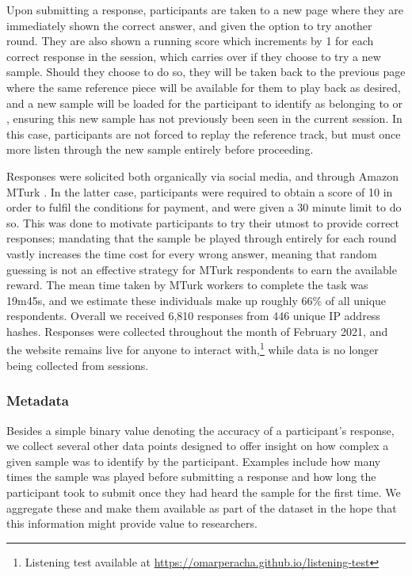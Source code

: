 \documentclass{article}
\begin{document}
Upon submitting a response, participants are taken to a new page where they are immediately shown the correct answer, and given the option to try another round. They are also shown a running score which increments by 1 for each correct response in the session, which carries over if they choose to try a new sample. Should they choose to do so, they will be taken back to the previous page where the same reference piece will be available for them to play back as desired, and a new sample will be loaded for the participant to identify as belonging to  or , ensuring this new sample has not previously been seen in the current session. In this case, participants are not forced to replay the reference track, but must once more listen through the new sample entirely before proceeding.

Responses were solicited both organically via social media, and through Amazon MTurk \cite{mturk}. In the latter case, participants were required to obtain a score of 10 in order to fulfil the conditions for payment, and were given a 30 minute limit to do so. This was done to motivate participants to try their utmost to provide correct responses; mandating that the sample be played through entirely for each round vastly increases the time cost for every wrong answer, meaning that random guessing is not an effective strategy for MTurk respondents to earn the available reward. The mean time taken by MTurk workers to complete the task was 19m45s, and we estimate these individuals make up roughly 66\% of all unique respondents. Overall we received 6,810 responses from 446 unique IP address hashes. Responses were collected throughout the month of February 2021, and the website remains live for anyone to interact with,\footnote{Listening test available at \url{https://omarperacha.github.io/listening-test}} while data is no longer being collected from sessions.

\subsubsection{Metadata}

Besides a simple binary value denoting the accuracy of a participant's response, we collect several other data points designed to offer insight on how complex a given sample was to identify by the participant. Examples include how many times the sample was played before submitting a response and how long the participant took to submit once they had heard the sample for the first time. We aggregate these and make them available as part of the dataset in the hope that this information might provide value to researchers.
\end{document}
